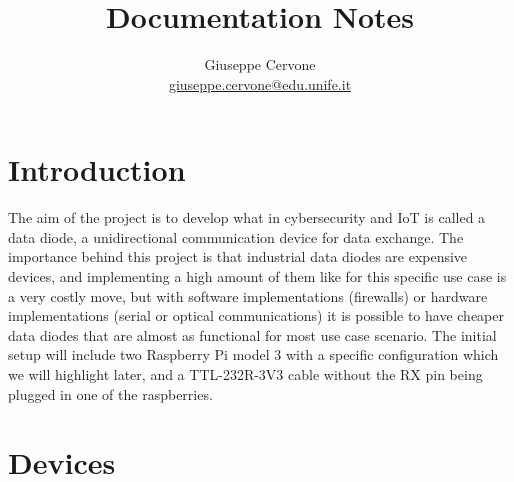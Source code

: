 \documentclass[a4paper,11pt]{scrartcl}
\title{Documentation Notes}
\date{}
\author{Giuseppe Cervone\\ \url{giuseppe.cervone@edu.unife.it}}
\begin{document}
\maketitle

\section{Introduction}
The aim of the project is to develop what in cybersecurity and IoT is called a data diode, a unidirectional communication device for data exchange. The importance behind this project is that industrial data diodes are expensive devices, and implementing a high amount of them like for this specific use case is a very costly move, but with software implementations (firewalls) or hardware implementations (serial or optical communications) it is possible to have cheaper data diodes that are almost as functional for most use case scenario. The initial setup will include two Raspberry Pi model 3 with a specific configuration which we will highlight later, and a TTL-232R-3V3 cable without the RX pin being plugged in one of the raspberries.

\section{Devices}
\end{document}
